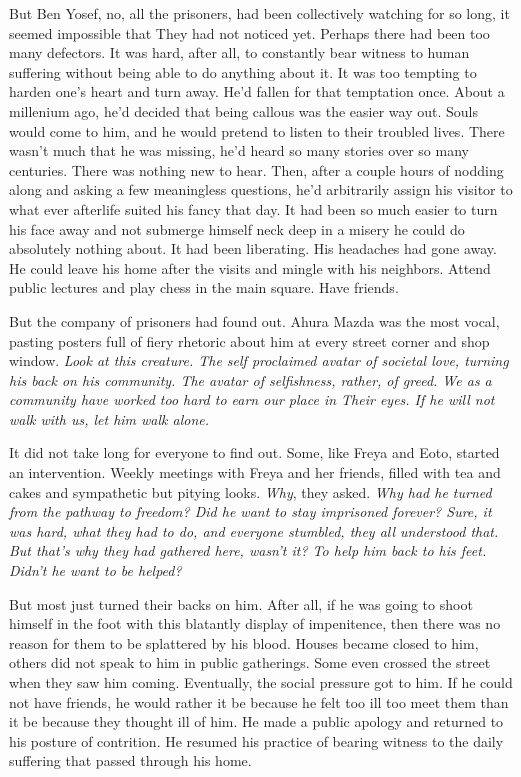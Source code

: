 \documentclass{amsart}
\begin{document}
But Ben Yosef, no, all the prisoners, had been collectively watching for so long, it seemed impossible that They had not noticed yet. Perhaps there had been too many defectors. It was hard, after all, to constantly bear witness to human suffering without being able to do anything about it. It was too tempting to harden one's heart and turn away. He'd fallen for that temptation once. About a millenium ago, he'd decided that being callous was the easier way out. Souls would come to him, and he would pretend to listen to their troubled lives. There wasn't much that he was missing, he'd heard so many stories over so many centuries. There was nothing new to hear. Then, after a couple hours of nodding along and asking a few meaningless questions, he'd arbitrarily assign his visitor to what ever afterlife suited his fancy that day. It had been so much easier to turn his face away and not submerge himself neck deep in a misery he could do absolutely nothing about. It had been liberating. His headaches had gone away. He could leave his home after the visits and mingle with his neighbors. Attend public lectures and play chess in the main square. Have friends.

But the company of prisoners had found out. Ahura Mazda was the most vocal, pasting posters full of fiery rhetoric about him at every street corner and shop window. \emph{Look at this creature. The self proclaimed avatar of societal love, turning his back on his community. The avatar of selfishness, rather, of greed. We as a community have worked too hard to earn our place in Their eyes. If he will not walk with us, let him walk alone.} 

It did not take long for everyone to find out. Some, like Freya and Eoto, started an intervention. Weekly meetings with Freya and her friends, filled with tea and cakes and sympathetic but pitying looks. \emph{Why}, they asked. \emph{Why had he turned from the pathway to freedom? Did he want to stay imprisoned forever? Sure, it was hard, what they had to do, and everyone stumbled, they all understood that. But that's why they had gathered here, wasn't it? To help him back to his feet. Didn't he want to be helped?} 

But most just turned their backs on him. After all, if he was going to shoot himself in the foot with this blatantly display of impenitence, then there was no reason for them to be splattered by his blood. Houses became closed to him, others did not speak to him in public gatherings. Some even crossed the street when they saw him coming. Eventually, the social pressure got to him. If he could not have friends, he would rather it be because he felt too ill too meet them than it be because they thought ill of him. He made a public apology and  returned to his posture of contrition. He resumed his practice of bearing witness to the daily suffering that passed through his home. 
\end{document}
